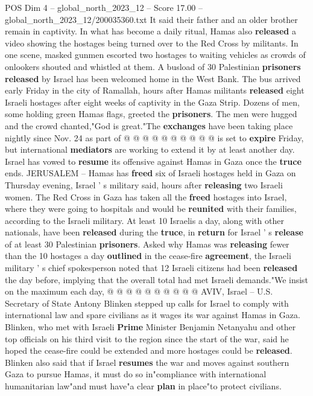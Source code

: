 \begin{textsample}{POS Dim 4 – global\_north\_2023\_12 – Score 17.00 – global\_north\_2023\_12/200035360.txt}
It said their father and an older brother remain in captivity.
In what has become a daily ritual, Hamas also \textbf{released} a video showing the hostages being turned over to the Red Cross by militants.
In one scene, masked gunmen escorted two hostages to waiting vehicles as crowds of onlookers shouted and whistled at them.
A busload of 30 Palestinian \textbf{prisoners} \textbf{released} by Israel has been welcomed home in the West Bank.
The bus arrived early Friday in the city of Ramallah, hours after Hamas militants \textbf{released} eight Israeli hostages after eight weeks of captivity in the Gaza Strip.
Dozens of men, some holding green Hamas flags, greeted the \textbf{prisoners}.
The men were hugged and the crowd chanted,"God is great."The \textbf{exchanges} have been taking place nightly since Nov. 24 as part of @ @ @ @ @ @ @ @ @ @ is set to \textbf{expire} Friday, but international \textbf{mediators} are working to extend it by at least another day.
Israel has vowed to \textbf{resume} its offensive against Hamas in Gaza once the \textbf{truce} ends.
JERUSALEM -- Hamas has \textbf{freed} six of Israeli hostages held in Gaza on Thursday evening, Israel ' s military said, hours after \textbf{releasing} two Israeli women.
The Red Cross in Gaza has taken all the \textbf{freed} hostages into Israel, where they were going to hospitals and would be \textbf{reunited} with their families, according to the Israeli military.
At least 10 Israelis a day, along with other nationals, have been \textbf{released} during the \textbf{truce}, in \textbf{return} for Israel ' s \textbf{release} of at least 30 Palestinian \textbf{prisoners}.
Asked why Hamas was \textbf{releasing} fewer than the 10 hostages a day \textbf{outlined} in the cease-fire \textbf{agreement}, the Israeli military ' s chief spokesperson noted that 12 Israeli citizens had been \textbf{released} the day before, implying that the overall total had met Israeli demands."We insist on the maximum each day, @ @ @ @ @ @ @ @ @ @ AVIV, Israel -- U.S.
Secretary of State Antony Blinken stepped up calls for Israel to comply with international law and spare civilians as it wages its war against Hamas in Gaza.
Blinken, who met with Israeli \textbf{Prime} Minister Benjamin Netanyahu and other top officials on his third visit to the region since the start of the war, said he hoped the cease-fire could be extended and more hostages could be \textbf{released}.
Blinken also said that if Israel \textbf{resumes} the war and moves against southern Gaza to pursue Hamas, it must do so in"compliance with international humanitarian law"and must have"a clear \textbf{plan} in place"to protect civilians.

\end{textsample}
